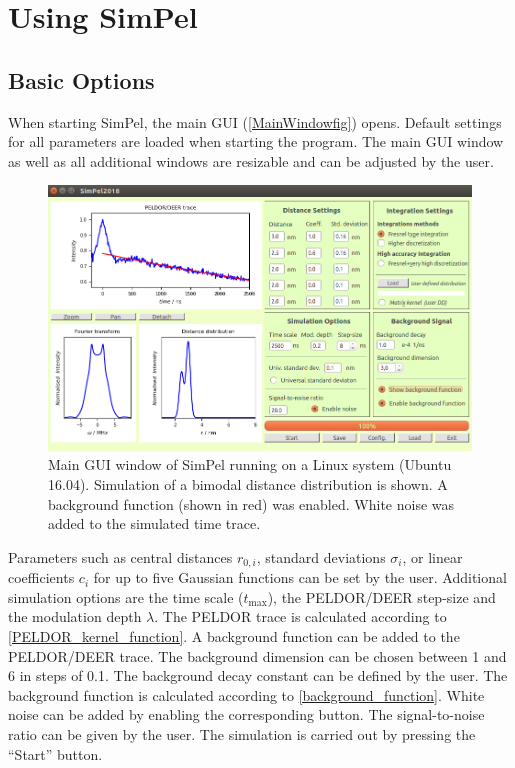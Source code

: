 \documentclass[pdftex,bezier,german,a4,twoside, headexclude,12pt,nochapterprefix, titlepage]{extarticle}
\newcommand{\simpel}{\textsf{SimPel}}
\begin{document}
\clearpage

\section{Using \simpel}

\subsection{Basic Options}

When starting \simpel, the main GUI (\autoref{MainWindowfig}) opens. Default settings for all parameters are loaded when starting the program. The main GUI window as well as all additional windows are resizable and can be adjusted by the user.

\begin{figure}[h!]
\begin{center}
\includegraphics[scale=0.5]{Main_Window_example.png}
\caption{Main GUI window of \simpel{} running on a Linux system (Ubuntu 16.04). Simulation of a bimodal distance distribution is shown. A background
function (shown in red) was enabled. White noise was added to the simulated time trace.}
\label{MainWindowfig}
\end{center}
\end{figure}

Parameters such as central distances $r_{0,i}$, standard deviations $\sigma_i$, or linear coefficients $c_i$ for up to five Gaussian functions can be set by the user. Additional simulation options are the time scale ($t_{\mathrm{max}}$), the 
PELDOR/DEER step-size and the modulation depth $\lambda$. The PELDOR trace is calculated according to  \autoref{PELDOR_kernel_function}. A background function can be added to the PELDOR/DEER trace. The background dimension can be chosen between 1 and 6 in steps of 0.1. The background decay constant can be defined by the user. The background function is calculated according to \autoref{background_function}. White noise can be added by enabling the corresponding button. The signal-to-noise ratio can be given by the user.
The simulation is carried out by pressing the ``Start'' button. 
\end{document}
